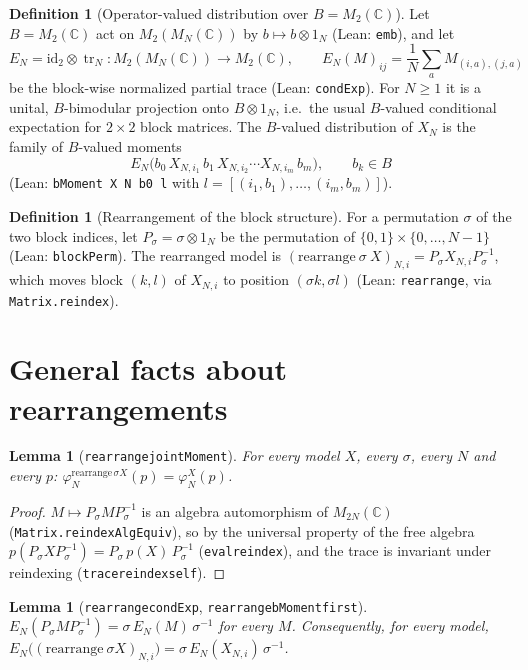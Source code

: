 \documentclass[11pt]{article}
\newtheorem{lemma}[theorem]{Lemma}
\theoremstyle{definition}
\newtheorem{definition}[theorem]{Definition}
\theoremstyle{remark}
\renewcommand{\_}{\oldus\allowbreak}
\newcommand{\tr}{\operatorname{tr}}
\newcommand{\C}{\mathbb{C}}
\begin{document}
\begin{definition}[Operator-valued distribution over $B=M_2(\C)$]
Let $B=M_2(\C)$ act on $M_2(M_N(\C))$ by $b\mapsto b\otimes 1_N$ (Lean: \texttt{emb}), and let
\[ E_N=\mathrm{id}_2\otimes\tr_N\colon M_2(M_N(\C))\to M_2(\C),\qquad
E_N(M)_{ij}=\frac1N\sum_{a} M_{(i,a),(j,a)} \]
be the block-wise normalized partial trace (Lean: \texttt{condExp}). For $N\ge1$ it is a unital,
$B$-bimodular projection onto $B\otimes 1_N$, i.e.\ the usual $B$-valued conditional expectation
for $2\times2$ block matrices.
The $B$-valued distribution of $X_N$ is the family of $B$-valued moments
\[ E_N\bigl(b_0\,X_{N,i_1}\,b_1\,X_{N,i_2}\cdots X_{N,i_m}\,b_m\bigr),\qquad b_k\in B \]
(Lean: \texttt{bMoment X N b0 l} with $l=[(i_1,b_1),\dots,(i_m,b_m)]$).
\end{definition}

\begin{definition}[Rearrangement of the block structure]
For a permutation $\sigma$ of the two block indices, let $P_\sigma=\sigma\otimes 1_N$ be the
permutation of $\{0,1\}\times\{0,\dots,N-1\}$ (Lean: \texttt{blockPerm}). The rearranged model is
$(\mathrm{rearrange}\ \sigma\ X)_{N,i}=P_\sigma X_{N,i}P_\sigma^{-1}$, which moves block $(k,l)$ of
$X_{N,i}$ to position $(\sigma k,\sigma l)$ (Lean: \texttt{rearrange}, via \texttt{Matrix.reindex}).
\end{definition}

\section{General facts about rearrangements}

\begin{lemma}[\texttt{rearrange\_jointMoment}]
For every model $X$, every $\sigma$, every $N$ and every $p$:
$\varphi_N^{\mathrm{rearrange}\,\sigma X}(p)=\varphi_N^{X}(p)$.
\end{lemma}

\begin{proof}
$M\mapsto P_\sigma M P_\sigma^{-1}$ is an algebra automorphism of $M_{2N}(\C)$
(\texttt{Matrix.reindexAlgEquiv}), so by the universal property of the free algebra
$p(P_\sigma X P_\sigma^{-1})=P_\sigma\,p(X)\,P_\sigma^{-1}$ (\texttt{eval\_reindex}), and the trace is
invariant under reindexing (\texttt{trace\_reindex\_self}).
\end{proof}

\begin{lemma}[\texttt{rearrange\_condExp}, \texttt{rearrange\_bMoment\_first}]
$E_N(P_\sigma M P_\sigma^{-1})=\sigma\,E_N(M)\,\sigma^{-1}$ for every $M$. Consequently, for every
model, $E_N\bigl((\mathrm{rearrange}\ \sigma X)_{N,i}\bigr)=\sigma\,E_N(X_{N,i})\,\sigma^{-1}$.
\end{lemma}
\end{document}
